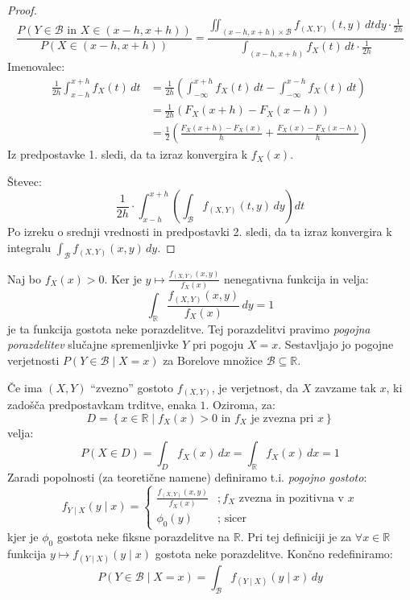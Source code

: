\documentclass[12pt]{book}
\def\n{\noindent}
\theoremstyle{definition}
\theoremstyle{plain}
\theoremstyle{plain}
\theoremstyle{plain}
\theoremstyle{plain}
\theoremstyle{remark}
\begin{document}
\begin{proof}
    $$
    \frac{P(Y \in \mathcal{B} \text { in } X \in(x-h, x+h))}{P(X \in(x-h, x+h))}=\frac{\iint_{(x-h, x+h) \times \mathcal{B}} f_{(X, Y)}(t, y) \, d t d y \cdot \frac{1}{2 h}}{\int_{(x-h, x+h)} f_X(t) \,d t \cdot \frac{1}{2 h}}
    $$
    Imenovalec: 
    $$
    \begin{aligned}
        \frac{1}{2 h} \int_{x-h}^{x+h} f_X(t) \, d t&=\frac{1}{2 h}\left(\int_{-\infty}^{x+h} f_X(t) \,d t-\int_{-\infty}^{x-h} f_X(t) \, d t\right) \\
        &=\frac{1}{2 h}\left(F_X(x+h)-F_X(x-h)\right) \\
        &=\frac{1}{2}\left(\frac{F_X(x+h)-F_X(x)}{h}+\frac{F_X(x)-F_X(x-h)}{h}\right)
    \end{aligned}
    $$
    Iz predpostavke 1. sledi, da ta izraz konvergira k $f_X(x)$.

    \n Števec:
    $$
    \frac{1}{2 h} \cdot \int_{x-h}^{x+h}\left(\int_{\mathcal{B}} f_{(X, Y)}(t, y) \, d y\right) d t
    $$
    Po izreku o srednji vrednosti in predpostavki 2. sledi, da ta izraz konvergira k integralu $\int_{\mathcal{B}} f_{(X, Y)}(x, y) \, d y$.
\end{proof}

\n Naj bo $f_X(x)>0$. Ker je $y \mapsto \frac{f_{(X, Y)}(x, y)}{f_X(x)}$ nenegativna funkcija in velja:
$$
\int_{\mathbb{R}} \frac{f_{(X, Y)}(x, y)}{f_X(x)} \,d y=1
$$
je ta funkcija gostota neke porazdelitve. Tej porazdelitvi pravimo \emph{pogojna porazdelitev} slučajne spremenljivke $Y$ pri pogoju $X=x$. Sestavljajo jo pogojne verjetnosti $P(Y \in \mathcal{B} \mid X=x)$ za Borelove množice $\mathcal{B} \subseteq \mathbb{R}$.

\n Če ima $(X,Y)$ “zvezno” gostoto $f_{(X,Y)}$, je verjetnost, da $X$ zavzame tak $x$, ki zadošča predpostavkam trditve, enaka $1$. Oziroma, za:
$$
D=\left\{x \in \mathbb{R} \mid f_X(x)>0 \text{ in }f_X \text{ je zvezna pri } x\right\}
$$
velja: 
$$
P(X \in D)=\int_D f_X(x) \,d x=\int_{\mathbb{R}} f_X(x) \, d x=1
$$
Zaradi popolnosti (za teoretične namene) definiramo t.i. \emph{pogojno gostoto}:
$$
f_{Y \mid X}(y \mid x)=\begin{cases}
    \frac{f_{(X, Y)}(x, y)}{f_X(x)} &;f_X \text { zvezna in pozitivna v }x \\
    \phi_0(y) &; \text { sicer }
    \end{cases}
$$
kjer je $\phi_0$ gostota neke fiksne porazdelitve na $\mathbb{R}$. Pri tej definiciji je za $\forall x \in \mathbb{R}$ funkcija $y \mapsto f_{(Y \mid X)}(y \mid x)$ gostota neke porazdelitve. Končno redefiniramo: 
$$
P(Y \in \mathcal{B} \mid X=x)=\int_{\mathcal{B}} f_{(Y \mid X)}(y \mid x) \, d y
$$
\end{document}
